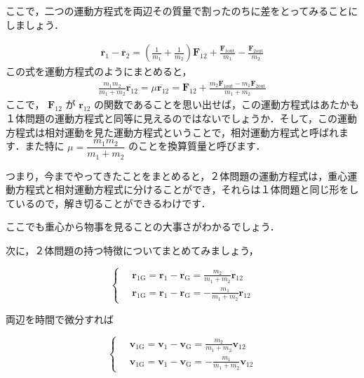\documentclass[
  b4paperpaper,
  xelatex,ja=standard]{bxjsbook}
\begin{document}
ここで，二つの運動方程式を両辺その質量で割ったのちに差をとってみることにしましょう．

\begin{align*}
\ddot{\boldsymbol{r}_1}-\ddot{\boldsymbol{r}_2} = \left(\frac{1}{m_1}+\frac{1}{m_2}\right) \boldsymbol{F}_{12}+\frac{\boldsymbol{F}_{1\text{out}}}{m_1}-\frac{\boldsymbol{F}_{2\text{out}}}{m_2}
\end{align*} この式を運動方程式のようにまとめると， \begin{align*}
\frac{m_1m_2}{m_1+m_2}\ddot{\boldsymbol{r}_{12}}=\mu\ddot{\boldsymbol{r}_{12}}=\boldsymbol{F}_{12} +\frac{m_2\boldsymbol{F}_{1\text{out}}-m_1\boldsymbol{F}_{2\text{out}}}{m_1+m_2}
\end{align*} ここで， \(\boldsymbol{F}_{12}\) が \(\boldsymbol{r}_{12}\)
の関数であることを思い出せば，この運動方程式はあたかも１体問題の運動方程式と同等に見えるのではないでしょうか．そして，この運動方程式は相対運動を見た運動方程式ということで，相対運動方程式と呼ばれます．また特に
\(\mu = \dfrac{m_1m_2}{m_1+m_2}\) のことを換算質量と呼びます．

つまり，今までやってきたことをまとめると，２体問題の運動方程式は，重心運動方程式と相対運動方程式に分けることができ，それらは１体問題と同じ形をしているので，解き切ることができるわけです．

ここでも重心から物事を見ることの大事さがわかるでしょう．

次に，２体問題の持つ特徴についてまとめてみましょう，

\begin{equation*}
\left\{ \,
    \begin{aligned}
    & \boldsymbol{r}_{1\text{G}}=\boldsymbol{r}_1-\boldsymbol{r}_{\text{G}}=\frac{m_2}{m_1+m_2}\boldsymbol{r}_{12} \\
    & \boldsymbol{r}_{1\text{G}}=\boldsymbol{r}_1-\boldsymbol{r}_{\text{G}}=-\frac{m_1}{m_1+m_2}\boldsymbol{r}_{12}
    \end{aligned}
\right.
\end{equation*}

両辺を時間で微分すれば

\begin{equation*}
\left\{ \,
    \begin{aligned}
    & \boldsymbol{v}_{1\text{G}}=\boldsymbol{v}_1-\boldsymbol{v}_{\text{G}}=\frac{m_2}{m_1+m_2}\boldsymbol{v}_{12} \\
    & \boldsymbol{v}_{1\text{G}}=\boldsymbol{v}_1-\boldsymbol{v}_{\text{G}}=-\frac{m_1}{m_1+m_2}\boldsymbol{v}_{12}
    \end{aligned}
\right.
\end{equation*}
\end{document}
